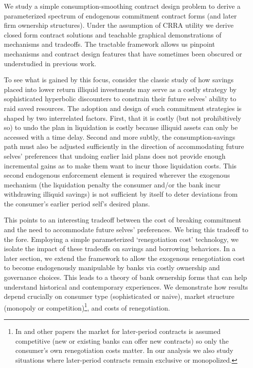 \documentclass[11pt,english]{article}
\theoremstyle{plain}
\theoremstyle{definition}
\begin{document}
 

We study a simple consumption-smoothing contract design problem to derive
a parameterized spectrum of endogenous commitment contract forms (and
later firm ownership structures). Under the assumption of CRRA utility we derive closed form contract solutions
and teachable graphical demonstrations of mechanisms and tradeoffs. The tractable framework
allows us pinpoint mechanisms and contract design features
that have sometimes been obscured or understudied in previous work.  

To see what is gained by this  focus, consider the classic \citet{laibson1997}
study of how savings placed into lower return illiquid investments
may serve as a costly strategy by sophisticated hyperbolic discounters
to constrain their future selves' ability to raid saved resources.
The adoption and design of such commitment strategies is shaped by two interrelated
factors. First, that it is costly (but not prohibitively so) to undo
the plan \textendash{} in \citet{laibson1997} liquidation is costly
because illiquid assets can only be accessed with a time delay.  Second
and more subtly, the consumption-savings path must also be adjusted
sufficiently in the direction of accommodating future
selves' preferences that undoing earlier laid plans does not provide enough
incremental gains as to make them want to incur those liquidation
costs. This second endogenous enforcement element is required wherever the exogenous mechanism (the liquidation penalty the consumer and/or the bank incur withdrawing illiquid savings)
is not sufficient by itself to deter deviations
from the consumer's earlier period self's desired plans.
 

This points to an interesting tradeoff between the cost
of breaking commitment and the need to accommodate future selves'
preferences. We bring this tradeoff to the fore. Employing a simple parameterized `renegotiation
cost' technology, we isolate the impact of
these tradeoffs on savings and borrowing behaviors. In a later section, we extend the framework to allow the exogenous renegotiation cost to become endogenously manipulable by banks via costly ownership and governance choices. This leads to a  theory of bank ownership forms that can help understand historical and contemporary experiences. We demonstrate how results depend crucially on consumer type (sophisticated or naive), market structure (monopoly or competition)\footnote
{In \citet{laibson1997} and other papers the market for later-period
contracts is assumed competitive (new or existing banks can offer
new contracts) so only the consumer's own renegotiation costs matter.
In our analysis we also study situations where later-period contracts
remain exclusive or monopolized. }, and costs of renegotiation.
\end{document}
